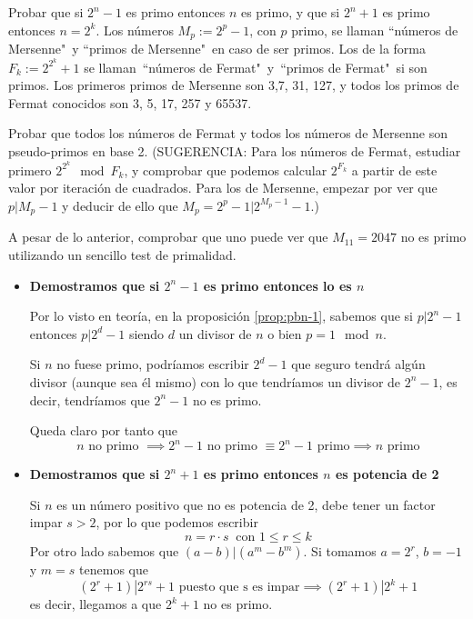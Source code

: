 \begin{problem}[10]
\ppart Probar que si $2^n-1$ es primo entonces $n$ es primo, y que si
$2^n+1$
 es primo entonces $n=2^k$. Los números $M_p:=2^p-1$, con $p$ primo, se
llaman ``números de Mersenne"\ y ``primos de Mersenne"\ en caso de
ser primos. Los de la forma $F_k:=2^{2^k}+1$ se llaman\ ``números
de Fermat"\ y\ ``primos de Fermat"\ si son primos. Los primeros
primos de Mersenne son 3,7, 31, 127, y todos los primos de Fermat
conocidos son 3, 5, 17, 257 y 65537.

\ppart Probar que todos los números de Fermat y todos los números de
Mersenne son pseudo-primos en base 2. (SUGERENCIA: Para los
números de Fermat, estudiar primero $2^{2^k} \mod F_k$, y
comprobar que podemos calcular $2^{F_k}$ a partir de este valor
por iteración de cuadrados. Para los de Mersenne, empezar por ver
que $p\vert M_p-1$ y deducir de ello que $M_p= 2^p-1\vert
2^{M_p-1}-1$.)

\ppart A pesar de lo anterior, comprobar que uno puede ver que $M_{11}=2047$ no es
primo utilizando un sencillo test de primalidad.

\solution


\spart
\begin{itemize}
\item \textbf{Demostramos que si $2^n-1$ es primo entonces lo es $n$}

Por lo visto en teoría, en la proposición \ref{prop:pbn-1}, sabemos que si $p|2^n-1$ entonces $p|2^d-1$ siendo $d$ un divisor de $n$ o bien $p=1 \mod n$.

Si $n$ no fuese primo, podríamos escribir $2^d-1$ que seguro tendrá algún divisor (aunque sea él mismo) con lo que tendríamos un divisor de $2^n-1$, es decir, tendríamos que $2^n-1$ no es primo.

Queda claro por tanto que
\[n \text{ no primo } \implies 2^n-1 \text{ no primo } \equiv 2^n-1 \text{ primo} \implies n \text{ primo}\]

\item \textbf{Demostramos que si $2^n+1$ es primo entonces $n$ es potencia de 2}

Si $n$ es un número positivo que no es potencia de 2, debe tener un factor impar $s>2$, por lo que podemos escribir
\[n = r\cdot s \ \text{ con } 1 \leq r \leq k\]
Por otro lado sabemos que $(a-b)|(a^m-b^m)$. Si tomamos $a=2^r$, $b=-1$ y $m=s$ tenemos que
\[(2^r+1)|2^{rs}+1 \text{ puesto que s es impar} \implies (2^r+1)|2^k+1\]
es decir, llegamos a que $2^k + 1$ no es primo.


\end{itemize}
\end{problem}
